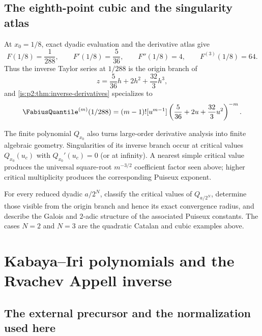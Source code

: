 \subsection{The eighth-point cubic and the singularity atlas}

At $x_0=1/8$, exact dyadic evaluation and the derivative atlas give
\begin{equation}
 F(1/8)=\frac1{288},
 \qquad F'(1/8)=\frac5{36},
 \qquad F''(1/8)=4,
 \qquad F^{(3)}(1/8)=64.
 \label{is:p2:eq:eighth-jet}
\end{equation}
Thus the inverse Taylor series at $1/288$ is the origin branch of
\begin{equation}
 z=\frac5{36}h+2h^2+\frac{32}{3}h^3,
 \label{is:p2:eq:eighth-cubic}
\end{equation}
and \cref{is:p2:thm:inverse-derivatives} specializes to
\begin{equation}
 \FabiusQuantile^{(m)}(1/288)
 =(m-1)![u^{m-1}]
 \left(\frac5{36}+2u+\frac{32}{3}u^2\right)^{-m}.
 \label{is:p2:eq:eighth-coeff}
\end{equation}

The finite polynomial $Q_{x_0}$ also turns large-order derivative analysis
into finite algebraic geometry.  Singularities of its inverse branch occur
at critical values $Q_{x_0}(u_c)$ with $Q_{x_0}'(u_c)=0$ (or at infinity).
A nearest simple critical value produces the universal square-root
$m^{-3/2}$ coefficient factor seen above; higher critical multiplicity
produces the corresponding Puiseux exponent.

\begin{problem}
\label{is:p2:prob:dyadic-singularity-atlas}
For every reduced dyadic $a/2^N$, classify the critical values of
$Q_{a/2^N}$, determine those visible from the origin branch and hence its
exact convergence radius, and describe the Galois and $2$-adic structure of
the associated Puiseux constants.  The cases $N=2$ and $N=3$ are the
quadratic Catalan and cubic examples above.
\end{problem}

\section{Kabaya--Iri polynomials and the Rvachev Appell inverse}
\label{is:p2:sec:appell}

\subsection{The external precursor and the normalization used here}

